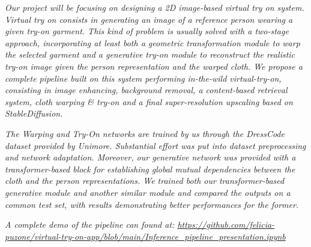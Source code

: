 \textit{Our project will be focusing on designing a 2D image-based virtual try on system. Virtual try on consists in generating an image of a reference person wearing a given try-on garment. This kind of problem is usually solved with a two-stage approach,  incorporating at least both a geometric transformation module to warp the selected garment and a generative try-on module to reconstruct the realistic try-on image given the person representation and the warped cloth.
We propose a complete pipeline built on this system performing in-the-wild virtual-try-on, consisting in image enhancing, background removal, a content-based retrieval system, cloth warping \& try-on and a final super-resolution upscaling based on StableDiffusion.}

\textit{The Warping and Try-On networks are trained by us through the DressCode dataset provided by Unimore. Substantial effort was put into dataset preprocessing and network adaptation. Moreover, our generative network was provided with a transformer-based block for establishing global mutual dependencies between the cloth and the person representations.
We trained both our transformer-based generative module and another similar module and compared the outputs on a common test set, with results demonstrating better performances for the former.}

\textit{A complete demo of the pipeline can found at: \url{https://github.com/felicia-puzone/virtual-try-on-app/blob/main/Inference_pipeline_presentation.ipynb}}